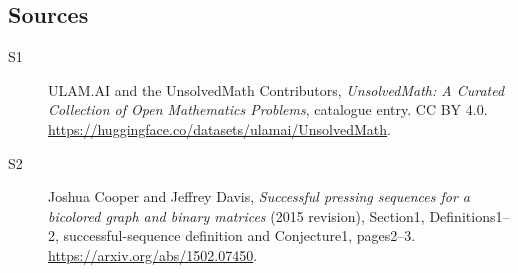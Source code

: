 \documentclass[11pt]{article}
\begin{document}
\subsection{Sources}
\begin{description}
\item[\hypertarget{source:statement:1}{S1}] ULAM.AI and the UnsolvedMath Contributors, \emph{UnsolvedMath: A Curated Collection of Open Mathematics Problems}, catalogue entry. CC BY 4.0. \url{https://huggingface.co/datasets/ulamai/UnsolvedMath}.
\item[\hypertarget{source:statement:2}{S2}] Joshua Cooper and Jeffrey Davis, \emph{Successful pressing sequences for a bicolored graph and binary matrices} (2015 revision), Section1, Definitions1--2, successful-sequence definition and Conjecture1, pages2--3. \url{https://arxiv.org/abs/1502.07450}.
\end{description}
\label{end:statement}
\end{document}
